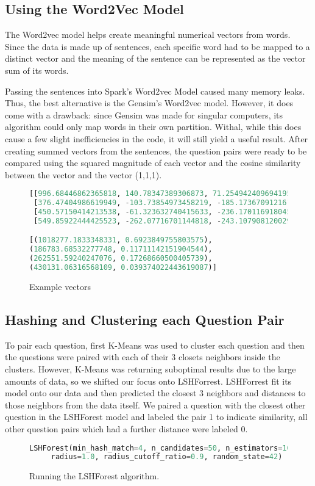 \documentclass[9pt,twocolumn,twoside]{idsi}
\begin{document}
\subsection{Using the Word2Vec Model}
The Word2vec model helps create meaningful numerical vectors from words.
Since the data is made up of sentences, each specific word had to be mapped to a distinct vector and the meaning of the sentence can be represented as the vector sum of its words. 

Passing the sentences into Spark's Word2vec Model caused many memory leaks. 
Thus, the best alternative is the Gensim's Word2vec model.
However, it does come with a drawback: since Gensim was made for singular computers, its algorithm could only map words in their own partition. Withal, while this does cause a few slight inefficiencies in the code, it will still yield a useful result.
After creating summed vectors from the sentences, the question pairs were ready to be compared using the squared magnitude of each vector and the cosine similarity between the vector and the vector (1,1,1). 

\begin{figure}[h!]
\begin{lstlisting}[language=python]
[[996.68446862365818, 140.78347389306873, 71.254942409694195],
 [376.47404986619949, -103.73854973458219, -185.17367091216147],
 [450.57150414213538, -61.323632740415633, -236.1701169180451],
 [549.85922444425523, -262.07716701144818, -243.10790812002961]]

[(1018277.1833348331, 0.6923849755803575),
(186783.68532277748, 0.11711142151904544),
(262551.59240247076, 0.17268660500405739),
(430131.06316568109, 0.039374022443619087)]
\end{lstlisting}
\caption{Example vectors} 
\end{figure}



\subsection{Hashing and Clustering each Question Pair}
To pair each question, first K-Means was used to cluster each question and then the questions were paired with each of their 3 closets neighbors inside the clusters. However, K-Means was returning suboptimal results due to the large amounts of data, so we shifted our focus onto LSHForrest. LSHForrest fit its model onto our data and then predicted the closest 3 neighbors and distances to those neighbors from the data itself. 
We paired a question with the closest other question in the LSHForest model and labeled the pair 1 to indicate similarity, all other question pairs which had a further distance were labeled 0. 
\begin{figure}[h!]

\begin{lstlisting}[language=python]
LSHForest(min_hash_match=4, n_candidates=50, n_estimators=10, n_neighbors=5,
     radius=1.0, radius_cutoff_ratio=0.9, random_state=42)
\end{lstlisting}
\caption{Running the LSHForest algorithm.}
\end{figure}
\end{document}
